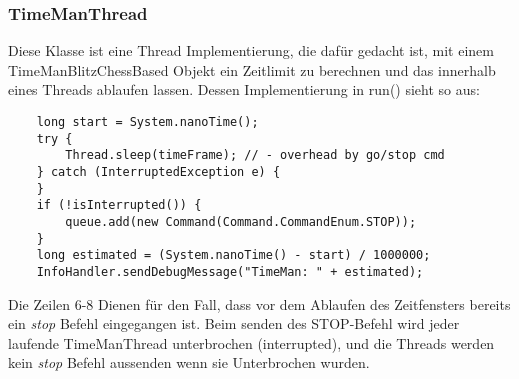 \subsubsection{TimeManThread}
Diese Klasse ist eine Thread Implementierung, die dafür gedacht ist, mit einem TimeManBlitzChessBased Objekt ein Zeitlimit zu berechnen und das innerhalb eines Threads ablaufen lassen. Dessen Implementierung in run() sieht so aus: 
\lstset{
  numbers=left,
  stepnumber=1,    
  firstnumber=1,
  numberfirstline=true
}
\begin{lstlisting}
    long start = System.nanoTime();
    try {
        Thread.sleep(timeFrame); // - overhead by go/stop cmd
    } catch (InterruptedException e) {
    }
    if (!isInterrupted()) {
        queue.add(new Command(Command.CommandEnum.STOP));
    }
    long estimated = (System.nanoTime() - start) / 1000000;
    InfoHandler.sendDebugMessage("TimeMan: " + estimated);
\end{lstlisting}
Die Zeilen 6-8 Dienen f\"ur den Fall, dass vor dem Ablaufen des Zeitfensters bereits ein \textit{stop} Befehl eingegangen ist. Beim senden des STOP-Befehl wird jeder laufende TimeManThread unterbrochen (interrupted), und die Threads werden kein \textit{stop} Befehl aussenden wenn sie Unterbrochen wurden.
